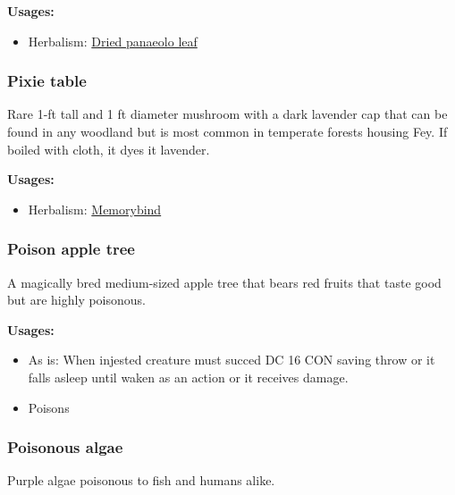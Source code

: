 \textbf{Usages:}

\begin{itemize}[noitemsep]
\item[] Herbalism: \hyperref[Dried panaeolo leaf]{Dried panaeolo leaf}
\end{itemize}

\subsubsection{Pixie table}
\label{Pixie table}

Rare 1-ft tall and 1 ft diameter mushroom with a dark lavender cap that can be found in any woodland but is most common in temperate forests housing Fey. If boiled with cloth, it dyes it lavender.

\vspace{5mm}

\textbf{Usages:}

\begin{itemize}[noitemsep]
\item[] Herbalism: \hyperref[Memorybind]{Memorybind}
\end{itemize}

\subsubsection{Poison apple tree}
\label{Poison apple tree}

A magically bred medium-sized apple tree that bears red fruits that taste good but are highly poisonous.

\vspace{5mm}

\textbf{Usages:}

\begin{itemize}[noitemsep]
\item[] As is: When injested creature must succed DC 16 CON saving throw or it falls asleep until waken as an action or it receives damage.
\item[] Poisons \poison\poison
\end{itemize}

\subsubsection{Poisonous algae}
\label{Poisonous algae}

Purple algae poisonous to fish and humans alike.

\vspace{5mm}

